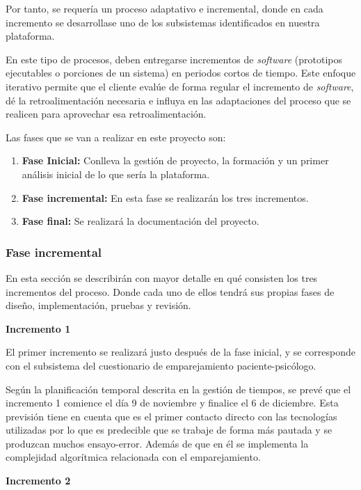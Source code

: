 Por tanto, se requería un proceso adaptativo e incremental, donde en cada incremento se desarrollase uno de los subsistemas identificados en nuestra plataforma.


En este tipo de procesos, deben entregarse incrementos de \textit{software} (prototipos ejecutables o porciones de un sistema) en periodos cortos de tiempo. Este enfoque iterativo permite que el cliente evalúe de forma regular el incremento de \textit{software}, dé la retroalimentación necesaria e influya en las adaptaciones del proceso que se realicen para aprovechar esa retroalimentación.


Las fases que se van a realizar en este proyecto son:
\begin{enumerate}
\item \textbf{Fase Inicial:} Conlleva la gestión de proyecto, la formación y un primer análisis inicial de lo que sería la plataforma.
\item \textbf{Fase incremental:} En esta fase se realizarán los tres incrementos.
\item \textbf{Fase final:} Se realizará la documentación del proyecto.
\end{enumerate}

\subsubsection{Fase incremental}
En esta sección se describirán con mayor detalle en qué consisten los tres incrementos del proceso. Donde cada uno de ellos tendrá sus propias fases de diseño, implementación, pruebas y revisión. \newline

\textbf{Incremento 1}\newline


El primer incremento se realizará justo después de la fase inicial, y se corresponde con el subsistema del cuestionario de emparejamiento paciente-psicólogo.


Según la planificación temporal descrita en la gestión de tiempos, se prevé que el incremento 1 comience el día 9 de noviembre y finalice el 6 de diciembre. Esta previsión tiene en cuenta que es el primer contacto directo con las tecnologías utilizadas por lo que es predecible que se trabaje de forma más pautada y se produzcan muchos ensayo-error. Además de que en él se implementa la complejidad algorítmica relacionada con el emparejamiento.\newline


\textbf{Incremento 2}\newline


